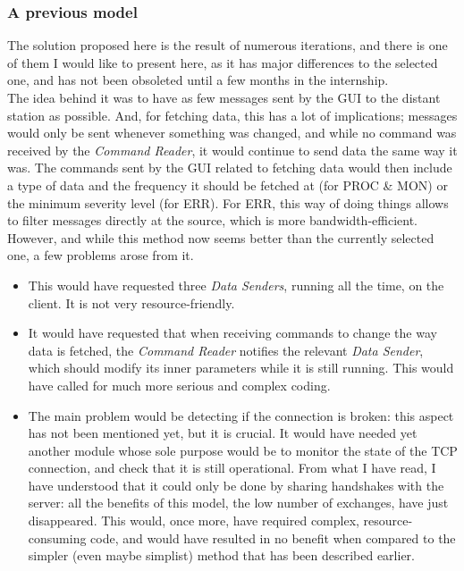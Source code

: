\documentclass{themeensg}
\begin{document}
\subsubsection{A previous model}

The solution proposed here is the result of numerous iterations, and there is one of them I would like to present here, as it has major differences to the selected one, and has not been obsoleted until a few months in the internship.\\

The idea behind it was to have as few messages sent by the GUI to the distant station as possible. And, for fetching data, this has a lot of implications; messages would only be sent whenever something was changed, and while no command was received by the \textit{Command Reader}, it would continue to send data the same way it was. The commands sent by the GUI related to fetching data would then include a type of data and the frequency it should be fetched at (for PROC \& MON) or the minimum severity level (for ERR). For ERR, this way of doing things allows to filter messages directly at the source, which is more bandwidth-efficient.\\

However, and while this method now seems better than the currently selected one, a few problems arose from it.\begin{itemize}
\item This would have requested three \textit{Data Senders}, running all the time, on the client. It is not very resource-friendly.
\item It would have requested that when receiving commands to change the way data is fetched, the \textit{Command Reader} notifies the relevant \textit{Data Sender}, which should modify its inner parameters while it is still running. This would have called for much more serious and complex coding.
\item The main problem would be detecting if the connection is broken: this aspect has not been mentioned yet, but it is crucial. It would have needed yet another module whose sole purpose would be to monitor the state of the TCP connection, and check that it is still operational. From what I have read, I have understood that it could only be done by sharing handshakes with the server: all the benefits of this model, the low number of exchanges, have just disappeared. This would, once more, have required complex, resource-consuming code, and would have resulted in no benefit when compared to the simpler (even maybe simplist) method that has been described earlier.
\end{itemize}
\end{document}

